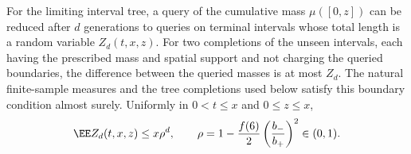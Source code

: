 \documentclass[11pt,letterpaper]{article}
\begin{document}
\begin{lemma}\label{lem:query-contraction}
For the limiting interval tree, a query of the cumulative mass
$\mu([0,z])$ can be reduced after $d$ generations to queries on terminal
intervals whose total length is a random variable $Z_d(t,x,z)$.
For two completions of the unseen intervals, each having the prescribed
mass and spatial support and not charging the queried boundaries, the
difference between the queried masses is at most $Z_d$. The natural
finite-sample measures and the tree completions used below satisfy this
boundary condition almost surely. Uniformly in $0<t\le x$ and $0\le z\le x$,
\begin{equation}\label{eq:query-contraction}
 \EE Z_d(t,x,z)\le x\rho^d,\qquad
 \rho=1-\frac{f(6)}2\left(\frac{b_-}{b_+}\right)^2\in(0,1).
\end{equation}
\end{lemma}
\end{document}
